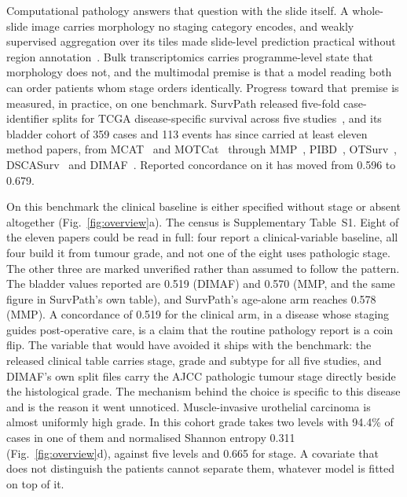 \documentclass[11pt]{article}
\begin{document}
Computational pathology answers that question with the slide itself. A whole-slide image carries
morphology no staging category encodes, and weakly supervised aggregation over its tiles made
slide-level prediction practical without region
annotation~\citep{lu2021clam, chen2024uni, ding2025titan}. Bulk transcriptomics carries
programme-level state that morphology does not, and the multimodal premise is that a model reading
both can order patients whom stage orders identically. Progress toward that premise is measured, in
practice, on one benchmark. SurvPath released five-fold case-identifier splits for TCGA
disease-specific survival across five studies~\citep{jaume2024survpath}, and its bladder cohort of
359 cases and 113 events has since carried at least eleven method papers, from
MCAT~\citep{chen2021mcat} and MOTCat~\citep{xu2023motcat} through MMP~\citep{song2024mmp},
PIBD~\citep{zhang2024pibd}, OTSurv~\citep{ren2025otsurv}, DSCASurv~\citep{song2025dscasurv} and
DIMAF~\citep{eijpe2025dimaf}. Reported concordance on it has moved from 0.596 to 0.679.

On this benchmark the clinical baseline is either specified without stage or absent altogether
(Fig.~\ref{fig:overview}a). The census is Supplementary Table~S1. Eight of the eleven papers
could be read in full: four report a clinical-variable baseline, all four build it from tumour
grade, and not one of the eight uses pathologic stage. The other three are marked unverified
rather than assumed to follow the pattern. The bladder values reported are 0.519 (DIMAF) and 0.570 (MMP, and the same figure in
SurvPath's own table), and SurvPath's age-alone arm reaches 0.578 (MMP). A concordance of 0.519 for
the clinical arm, in a disease whose staging guides post-operative care, is a claim that the routine
pathology report is a coin flip. The variable that would have avoided it ships with the benchmark:
the released clinical table carries stage, grade and subtype for all five studies, and DIMAF's own
split files carry the AJCC pathologic tumour stage directly beside the histological grade. The
mechanism behind the choice is specific to this disease and is the reason it went unnoticed.
Muscle-invasive urothelial carcinoma is almost uniformly high grade. In this cohort grade
takes two levels with 94.4\% of cases in one of them and normalised Shannon entropy
0.311 (Fig.~\ref{fig:overview}d), against five levels and 0.665 for stage. A covariate
that does not distinguish the patients cannot separate them, whatever model is fitted on top of it.
\end{document}
